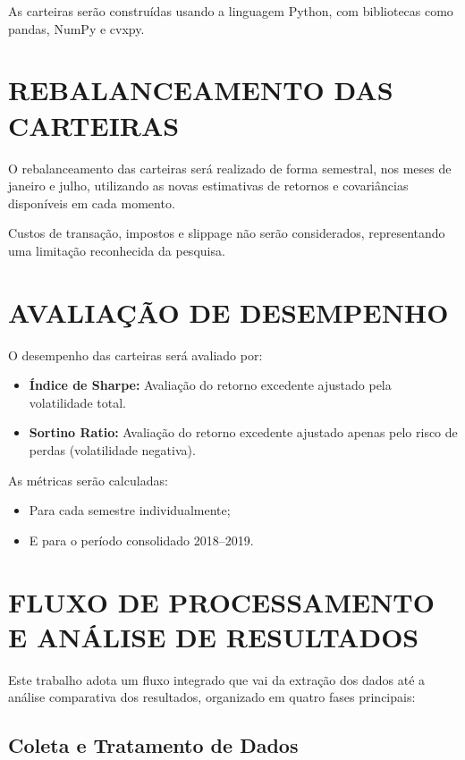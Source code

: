 As carteiras serão construídas usando a linguagem Python, com bibliotecas como pandas, NumPy e cvxpy.

\section{REBALANCEAMENTO DAS CARTEIRAS}

O rebalanceamento das carteiras será realizado de forma semestral, nos meses de janeiro e julho, utilizando as novas estimativas de retornos e covariâncias disponíveis em cada momento.

Custos de transação, impostos e slippage não serão considerados, representando uma limitação reconhecida da pesquisa.

\section{AVALIAÇÃO DE DESEMPENHO}

O desempenho das carteiras será avaliado por:

\begin{itemize}
    \item \textbf{Índice de Sharpe:} Avaliação do retorno excedente ajustado pela volatilidade total.
    \item \textbf{Sortino Ratio:} Avaliação do retorno excedente ajustado apenas pelo risco de perdas (volatilidade negativa).
\end{itemize}

As métricas serão calculadas:
\begin{itemize}
    \item Para cada semestre individualmente;
    \item E para o período consolidado 2018--2019.
\end{itemize}

\section{FLUXO DE PROCESSAMENTO E ANÁLISE DE RESULTADOS}

Este trabalho adota um fluxo integrado que vai da extração dos dados até a análise comparativa dos resultados, organizado em quatro fases principais:

\subsection{Coleta e Tratamento de Dados}

